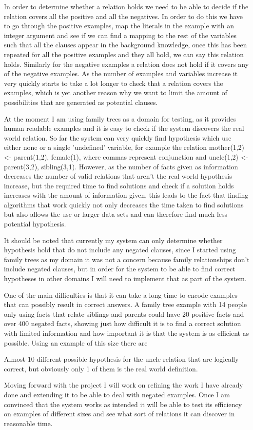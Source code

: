 \documentclass{article}
\begin{document}
In order to determine whether a relation holds we need to be able to decide if
the relation covers all the positive and all the negatives. In order to do this
we have to go through the positive examples, map the literals in the example
with an integer argument and see if we can find a mapping to the rest of the
variables such that all the clauses appear in the background knowledge, once
this has been repeated for all the positive examples and they all hold, we can
say this relation holds. Similarly for the negative examples a relation does
not hold if it covers any of the negative examples. As the number of examples
and variables increase it very quickly starts to take a lot longer to check that
a relation covers the examples, which is yet another reason why we want to
limit the amount of possibilities that are generated as potential clauses.

At the moment I am using family trees as a domain for testing, as it provides
human readable examples and it is easy to check if the system discovers the
real world relation. So far the system can very quickly find hypothesis
which use either none or a single 'undefined' variable, for example the
relation mother(1,2) <- parent(1,2), female(1), where commas represent
conjunction and uncle(1,2) <- parent(3,2), sibling(3,1). However, as the number
of facts given as information decreases the number of valid relations that
aren't the real world hypothesis increase, but the required time to find
solutions and check if a solution holds increases with the amount of information
given, this leads to the fact that finding algorithms that work quickly not
only decreases the time taken to find solutions but also allows the use or
larger data sets and can therefore find much less potential hypothesis.

It should be noted that currently my system can only determine whether
hypothesis hold that do not include any negated clauses, since I started using
family trees as my domain it was not a concern because family relationships
don't include negated clauses, but in order for the system to be able to find
correct hypotheses in other domains I will need to implement that as part of
the system.

One of the main difficulties is that it can take a long time to encode examples
that can possibly result in correct answers. A family tree example with 14
people only using facts that relate siblings and parents could have 20 positive
facts and over 400 negated facts, showing just how difficult it is to find a
correct solution with limited information and how important it is that the
system is as efficient as possible. Using an example of this size there are

Almost 10 different possible hypothesis for the uncle relation that are
logically correct, but obviously only 1 of them is the real world definition.

Moving forward with the project I will work on refining the work I have already
done and extending it to be able to deal with negated examples. Once I am
convinced that the system works as intended it will be able to test its
efficiency on examples of different sizes and see what sort of relations it can
discover in reasonable time.



\end{document}
